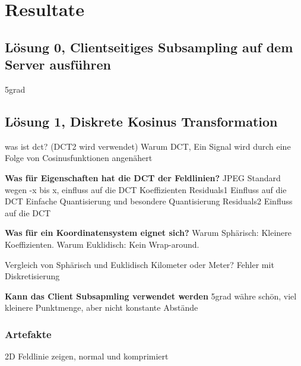 \section{Resultate}

\subsection{Lösung 0, Clientseitiges Subsampling auf dem Server ausführen }
5grad

\subsection{Lösung 1, Diskrete Kosinus Transformation}
was ist dct? (DCT2 wird verwendet)
Warum DCT, Ein Signal wird durch eine Folge von Cosinusfunktionen angenähert

\textbf{Was für Eigenschaften hat die DCT der Feldlinien?}
JPEG Standard wegen -x bis x, einfluss auf die DCT Koeffizienten
Residuals1 Einfluss auf die DCT
Einfache Quantisierung und besondere Quantisierung
Residuals2 Einfluss auf die DCT


\textbf{Was für ein Koordinatensystem eignet sich?}
Warum Sphärisch: Kleinere Koeffizienten.
Warum Euklidisch: Kein Wrap-around.

Vergleich von Sphärisch und Euklidisch 
Kilometer oder Meter?
Fehler mit Diskretisierung

\textbf{Kann das Client Subsapmling verwendet werden}
5grad währe schön, viel kleinere Punktmenge, aber nicht konstante Abstände

\subsubsection{Artefakte}
2D Feldlinie zeigen, normal und komprimiert
